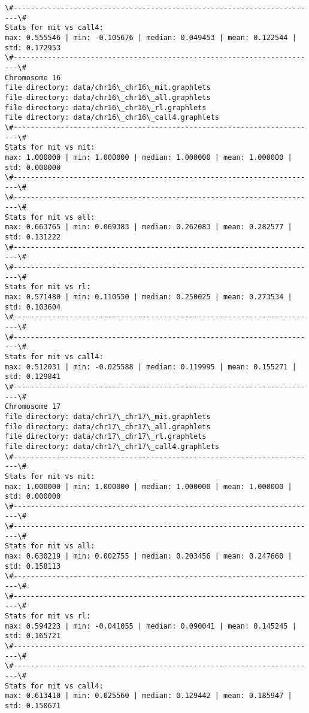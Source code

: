 \documentclass[11pt]{article}
\begin{document}
\begin{Verbatim}[commandchars=\\\{\}]
\#-----------------------------------------------------------------------\#
Stats for mit vs call4: 
max: 0.555546 | min: -0.105676 | median: 0.049453 | mean: 0.122544 | std: 0.172953
\#-----------------------------------------------------------------------\#
Chromosome 16
file directory: data/chr16\_chr16\_mit.graphlets
file directory: data/chr16\_chr16\_all.graphlets
file directory: data/chr16\_chr16\_rl.graphlets
file directory: data/chr16\_chr16\_call4.graphlets
\#-----------------------------------------------------------------------\#
Stats for mit vs mit: 
max: 1.000000 | min: 1.000000 | median: 1.000000 | mean: 1.000000 | std: 0.000000
\#-----------------------------------------------------------------------\#
\#-----------------------------------------------------------------------\#
Stats for mit vs all: 
max: 0.663765 | min: 0.069383 | median: 0.262083 | mean: 0.282577 | std: 0.131222
\#-----------------------------------------------------------------------\#
\#-----------------------------------------------------------------------\#
Stats for mit vs rl: 
max: 0.571480 | min: 0.110550 | median: 0.250025 | mean: 0.273534 | std: 0.103604
\#-----------------------------------------------------------------------\#
\#-----------------------------------------------------------------------\#
Stats for mit vs call4: 
max: 0.512031 | min: -0.025588 | median: 0.119995 | mean: 0.155271 | std: 0.129841
\#-----------------------------------------------------------------------\#
Chromosome 17
file directory: data/chr17\_chr17\_mit.graphlets
file directory: data/chr17\_chr17\_all.graphlets
file directory: data/chr17\_chr17\_rl.graphlets
file directory: data/chr17\_chr17\_call4.graphlets
\#-----------------------------------------------------------------------\#
Stats for mit vs mit: 
max: 1.000000 | min: 1.000000 | median: 1.000000 | mean: 1.000000 | std: 0.000000
\#-----------------------------------------------------------------------\#
\#-----------------------------------------------------------------------\#
Stats for mit vs all: 
max: 0.630219 | min: 0.002755 | median: 0.203456 | mean: 0.247660 | std: 0.158113
\#-----------------------------------------------------------------------\#
\#-----------------------------------------------------------------------\#
Stats for mit vs rl: 
max: 0.594223 | min: -0.041055 | median: 0.090041 | mean: 0.145245 | std: 0.165721
\#-----------------------------------------------------------------------\#
\#-----------------------------------------------------------------------\#
Stats for mit vs call4: 
max: 0.613410 | min: 0.025560 | median: 0.129442 | mean: 0.185947 | std: 0.150671

\end{Verbatim}
\end{document}
